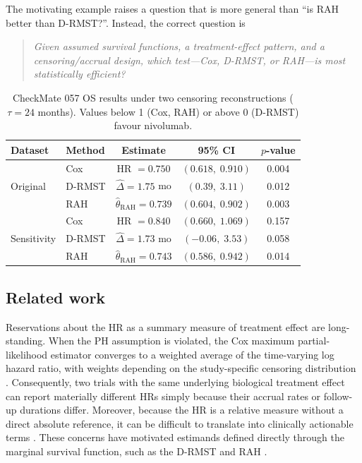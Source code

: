 \documentclass[12pt]{article}
\newcommand{\RAH}{\mathrm{RAH}}
\begin{document}
The motivating example raises a question that is more general than
``is RAH better than D-RMST?''. Instead, the correct question is

\begin{quote}
\emph{Given assumed survival functions, a treatment-effect pattern, and
a censoring/accrual design, which test---Cox, D-RMST, or RAH---is most
statistically efficient?}
\end{quote}




\begin{table}[ht]
\centering
\caption{CheckMate 057 OS results under two censoring reconstructions
  ($\tau=24$ months).
  Values below 1 (Cox, RAH) or above 0 (D-RMST) favour nivolumab.}
\label{tab:results-cm057-intro}
\medskip
\begin{tabular}{llccc}
\toprule
Dataset & Method & Estimate & 95\% CI & $p$-value \\
\midrule
\multirow{3}{*}{Original} & Cox  & HR $= 0.750$ & $(0.618,\; 0.910)$ & 0.004 \\
  & D-RMST  & $\hat\Delta = 1.75$ mo & $(0.39,\; 3.11)$ & 0.012 \\
  & RAH  & $\hat\theta_{\RAH} = 0.739$ & $(0.604,\; 0.902)$ & 0.003 \\
\midrule
\multirow{3}{*}{Sensitivity} & Cox  & HR $= 0.840$ & $(0.660,\; 1.069)$ & 0.157 \\
  & D-RMST  & $\hat\Delta = 1.73$ mo & $(-0.06,\; 3.53)$ & 0.058 \\
  & RAH  & $\hat\theta_{\RAH} = 0.743$ & $(0.586,\; 0.942)$ & 0.014 \\
\bottomrule
\end{tabular}
\end{table}


\subsection{Related work}
\label{sec:related}

Reservations about the HR as a summary measure of treatment effect are long-standing. When the PH assumption is violated, the Cox maximum partial-likelihood estimator converges to a weighted average of the time-varying log hazard ratio, with weights depending on the study-specific censoring distribution \citep{Cox1972,Hernan2010,Horiguchi2019}. Consequently, two trials with the same underlying biological treatment effect can report materially different HRs simply because their accrual rates or follow-up durations differ. Moreover, because the HR is a relative measure without a direct absolute reference, it can be difficult to translate into clinically actionable terms \citep{Uno2014}. These concerns have motivated estimands defined directly through the marginal survival function, such as the D-RMST \citep{Royston2013,Uno2014,Tian2014,survRM2} and RAH \citep{Uno2023,meng2026efficient}.
\end{document}
